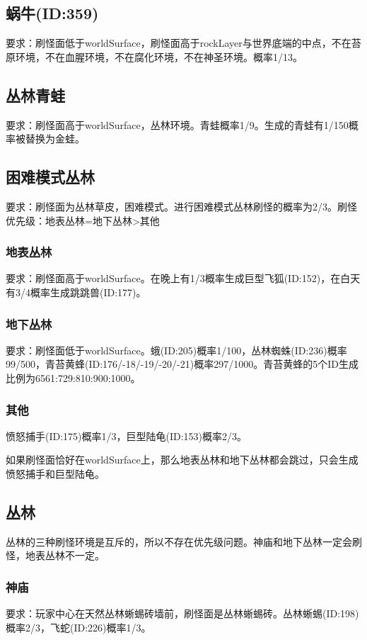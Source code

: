 \subsection{蜗牛(ID:359)}
要求：刷怪面低于worldSurface，刷怪面高于rockLayer与世界底端的中点，不在苔原环境，不在血腥环境，不在腐化环境，不在神圣环境。概率1/13。

\subsection{丛林青蛙}
要求：刷怪面高于worldSurface，丛林环境。青蛙概率1/9。生成的青蛙有1/150概率被替换为金蛙。

\subsection{困难模式丛林}
要求：刷怪面为丛林草皮，困难模式。进行困难模式丛林刷怪的概率为2/3。刷怪优先级：地表丛林=地下丛林>其他

\subsubsection{地表丛林}
要求：刷怪面高于worldSurface。在晚上有1/3概率生成巨型飞狐(ID:152)，在白天有3/4概率生成跳跳兽(ID:177)。

\subsubsection{地下丛林}
要求：刷怪面低于worldSurface。蛾(ID:205)概率1/100，丛林蜘蛛(ID:236)概率99/500，青苔黄蜂(ID:176/-18/-19/-20/-21)概率297/1000。青苔黄蜂的5个ID生成比例为6561:729:810:900:1000。

\subsubsection{其他}
愤怒捕手(ID:175)概率1/3，巨型陆龟(ID:153)概率2/3。

\begin{remark}
如果刷怪面恰好在worldSurface上，那么地表丛林和地下丛林都会跳过，只会生成愤怒捕手和巨型陆龟。
\end{remark}

\subsection{丛林}
丛林的三种刷怪环境是互斥的，所以不存在优先级问题。神庙和地下丛林一定会刷怪，地表丛林不一定。

\subsubsection{神庙}
要求：玩家中心在天然丛林蜥蜴砖墙前，刷怪面是丛林蜥蜴砖。丛林蜥蜴(ID:198)概率2/3，飞蛇(ID:226)概率1/3。

